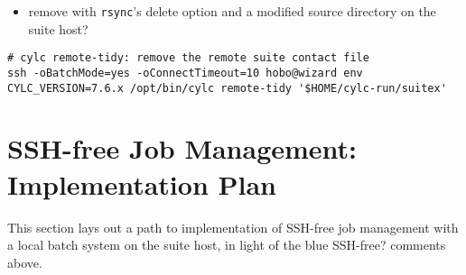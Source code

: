 \documentclass{article}
\begin{document}
{\color{blue}{\bf SSH-free?}
\begin{itemize}
  \item remove with \lstinline=rsync='s delete option and a modified source
    directory on the suite host?
\end{itemize}
}

\vspace{5mm}
    \begin{lstlisting}
# cylc remote-tidy: remove the remote suite contact file
ssh -oBatchMode=yes -oConnectTimeout=10 hobo@wizard env CYLC_VERSION=7.6.x /opt/bin/cylc remote-tidy '$HOME/cylc-run/suitex'
    \end{lstlisting}

\section{SSH-free Job Management: Implementation Plan}
\label{Implementation}

This section lays out a path to implementation of SSH-free job management
with a local batch system on the suite host, in light of the blue
{\color{blue}SSH-free?} comments above.
\end{document}
